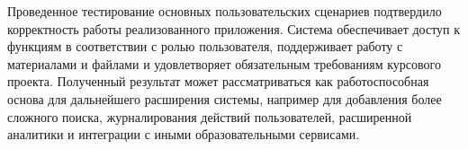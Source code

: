 \documentclass[14pt,a4paper]{extarticle}
\begin{document}
Проведенное тестирование основных пользовательских сценариев подтвердило корректность работы реализованного приложения. Система обеспечивает доступ к функциям в соответствии с ролью пользователя, поддерживает работу с материалами и файлами и удовлетворяет обязательным требованиям курсового проекта. Полученный результат может рассматриваться как работоспособная основа для дальнейшего расширения системы, например для добавления более сложного поиска, журналирования действий пользователей, расширенной аналитики и интеграции с иными образовательными сервисами.
\end{document}
